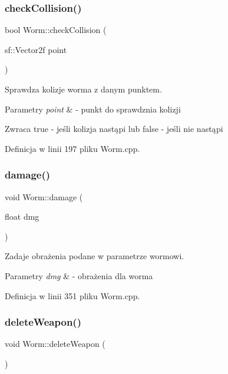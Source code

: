 \subsubsection{\texorpdfstring{check\+Collision()}{checkCollision()}}
{\footnotesize\ttfamily bool Worm\+::check\+Collision (\begin{DoxyParamCaption}\item[{sf\+::\+Vector2f}]{point }\end{DoxyParamCaption})}



Sprawdza kolizje worma z danym punktem. 


\begin{DoxyParams}{Parametry}
{\em point} & -\/ punkt do sprawdznia kolizji \\
\hline
\end{DoxyParams}
\begin{DoxyReturn}{Zwraca}
true -\/ jeśli kolizja nastąpi lub false -\/ jeśli nie nastąpi 
\end{DoxyReturn}


Definicja w linii 197 pliku Worm.\+cpp.

\mbox{\label{class_worm_aa57fe22ce4031e5332d16d709e7274c8}} 
\subsubsection{\texorpdfstring{damage()}{damage()}}
{\footnotesize\ttfamily void Worm\+::damage (\begin{DoxyParamCaption}\item[{float}]{dmg }\end{DoxyParamCaption})}



Zadaje obrażenia podane w parametrze wormowi. 


\begin{DoxyParams}{Parametry}
{\em dmg} & -\/ obrażenia dla worma \\
\hline
\end{DoxyParams}


Definicja w linii 351 pliku Worm.\+cpp.

\mbox{\label{class_worm_adbede9b2b03f764f71629a299aec5299}} 
\subsubsection{\texorpdfstring{delete\+Weapon()}{deleteWeapon()}}
{\footnotesize\ttfamily void Worm\+::delete\+Weapon (\begin{DoxyParamCaption}{ }\end{DoxyParamCaption})}



